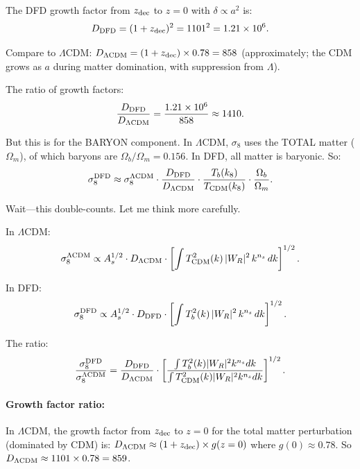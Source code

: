 \documentclass[11pt]{article}
\newcommand{\ee}[1]{\times 10^{#1}}
\newcommand{\LCDM}{$\Lambda$CDM}
\newcommand{\Ob}{\Omega_b}
\newcommand{\Om}{\Omega_m}
\begin{document}
The DFD growth factor from $z_{\rm dec}$ to $z = 0$ with
$\delta \propto a^2$ is:
\begin{equation}
D_{\rm DFD} = (1+z_{\rm dec})^2 = 1101^2 = 1.21\ee{6}.
\end{equation}

Compare to \LCDM: $D_{\Lambda\rm CDM} = (1+z_{\rm dec})\times 0.78
= 858$ (approximately; the CDM grows as $a$ during matter domination,
with suppression from $\Lambda$).

The ratio of growth factors:
\begin{equation}
\frac{D_{\rm DFD}}{D_{\Lambda\rm CDM}} = \frac{1.21\ee{6}}{858}
\approx 1410.
\end{equation}

But this is for the BARYON component. In \LCDM, $\sigma_8$ uses the
TOTAL matter ($\Omega_m$), of which baryons are $\Ob/\Om = 0.156$.
In DFD, all matter is baryonic. So:
\begin{equation}
\sigma_8^{\rm DFD}
\approx \sigma_8^{\Lambda\rm CDM}\cdot
\frac{D_{\rm DFD}}{D_{\Lambda\rm CDM}}\cdot
\frac{T_b(k_8)}{T_{\rm CDM}(k_8)}\cdot
\frac{\Ob}{\Om}.
\label{eq:sigma8-ratio}
\end{equation}

Wait---this double-counts. Let me think more carefully.

In \LCDM:
\begin{equation}
\sigma_8^{\Lambda\rm CDM} \propto A_s^{1/2}\cdot D_{\Lambda\rm CDM}
\cdot \left[\int T_{\rm CDM}^2(k)\,|W_R|^2\,k^{n_s}\,dk\right]^{1/2}.
\end{equation}

In DFD:
\begin{equation}
\sigma_8^{\rm DFD} \propto A_s^{1/2}\cdot D_{\rm DFD}
\cdot \left[\int T_b^2(k)\,|W_R|^2\,k^{n_s}\,dk\right]^{1/2}.
\end{equation}

The ratio:
\begin{equation}
\frac{\sigma_8^{\rm DFD}}{\sigma_8^{\Lambda\rm CDM}}
= \frac{D_{\rm DFD}}{D_{\Lambda\rm CDM}}\cdot
\left[\frac{\int T_b^2(k)|W_R|^2 k^{n_s}dk}
{\int T_{\rm CDM}^2(k)|W_R|^2 k^{n_s}dk}\right]^{1/2}.
\label{eq:sigma8-ratio2}
\end{equation}

\paragraph{Growth factor ratio:}
In \LCDM, the growth factor from $z_{\rm dec}$ to $z = 0$ for the
total matter perturbation (dominated by CDM) is:
$D_{\Lambda\rm CDM} \approx (1+z_{\rm dec})\times g(z=0)$
where $g(0) \approx 0.78$. So $D_{\Lambda\rm CDM} \approx 1101
\times 0.78 = 859$.
\end{document}
